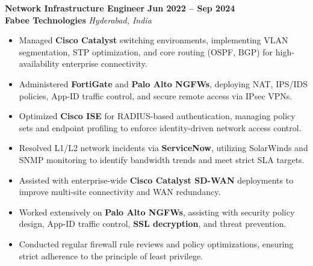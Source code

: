 \documentclass[10pt,a4paper]{article}
\newcommand{\jobheading}[4]{
  \vspace{1.5ex}\noindent
  {\large\textbf{\color{darkteal}#1}} \hfill \textbf{\color{textmain}#2} \\[0.3ex]
  \textbf{\color{textdark}#3} \hfill \textit{\color{textmain}#4} \vspace{0.8ex}
}
\begin{document}
\jobheading{Network Infrastructure Engineer}{Jun 2022 -- Sep 2024}{Fabee Technologies}{Hyderabad, India}
\begin{itemize}[label={\color{teal}\textbullet},leftmargin=*,itemsep=3pt,parsep=1pt,topsep=1pt]
    \item Managed \textbf{Cisco Catalyst} switching environments, implementing VLAN segmentation, STP optimization, and core routing (OSPF, BGP) for high-availability enterprise connectivity.
    \item Administered \textbf{FortiGate} and \textbf{Palo Alto NGFWs}, deploying NAT, IPS/IDS policies, App-ID traffic control, and secure remote access via IPsec VPNs.
    \item Optimized \textbf{Cisco ISE} for RADIUS-based authentication, managing policy sets and endpoint profiling to enforce identity-driven network access control.
    \item Resolved L1/L2 network incidents via \textbf{ServiceNow}, utilizing SolarWinds and SNMP monitoring to identify bandwidth trends and meet strict SLA targets.
    \item Assisted with enterprise-wide \textbf{Cisco Catalyst SD-WAN} deployments to improve multi-site connectivity and WAN redundancy.
    \item Worked extensively on \textbf{Palo Alto NGFWs}, assisting with security policy design, App-ID traffic control, \textbf{SSL decryption}, and threat prevention.
    \item Conducted regular firewall rule reviews and policy optimizations, ensuring strict adherence to the principle of least privilege.
\end{itemize}
\end{document}
